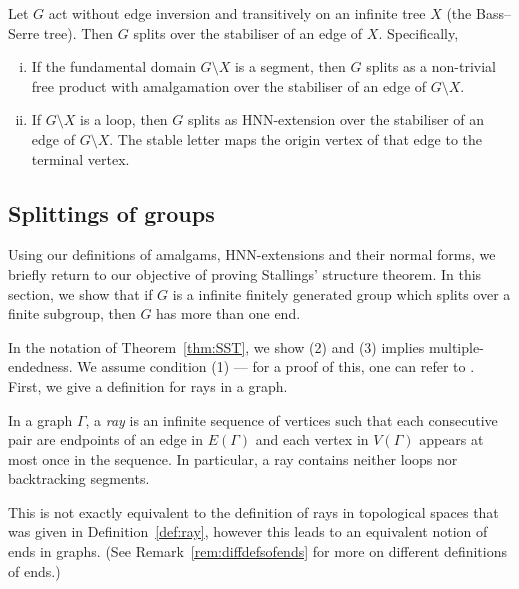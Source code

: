 \begin{theorem}
\label{thm:bassserre}
     Let \(G\) act without edge inversion and transitively on an infinite tree \(X\) (the Bass--Serre tree). Then \(G\) splits over the stabiliser of an edge of \(X\). Specifically,
\begin{enumerate}[(i)]
    \item If the fundamental domain \(G \setminus X\) is a segment, then \(G\) splits as a non-trivial free product with amalgamation over the stabiliser of an edge of \(G \setminus X\). 
    \item If \(G \setminus X\) is a loop, then \(G\) splits as HNN-extension over the stabiliser of an edge of \(G \setminus X\). The stable letter maps the origin vertex of that edge to the terminal vertex.
\end{enumerate}
\end{theorem}

\subsection{Splittings of groups}
  Using our definitions of amalgams, HNN-extensions and their normal forms, we briefly return to our objective of proving Stallings' structure theorem. In this section, we show that if \(G\) is a infinite finitely generated group which splits over a finite subgroup, then \(G\) has more than one end. 
  
  In the notation of Theorem~\ref{thm:SST}, we show (2) and (3) implies multiple-endedness. We assume condition (1) --- for a proof of this, one can refer to \cite[Chapter 11.6, Corollary 11.34]{M08}. First, we give a definition for rays in a graph.

\begin{definition}
    In a graph \(\Gamma\), a \emph{ray} is an infinite sequence of vertices such that each consecutive pair are endpoints of an edge in \(E(\Gamma)\) and each vertex in \(V(\Gamma)\) appears at most once in the sequence. In particular, a ray contains neither loops nor backtracking segments.
\end{definition}

\begin{caveat}
    This is not exactly equivalent to the definition of rays in topological spaces that was given in Definition~\ref{def:ray}, however this leads to an equivalent notion of ends in graphs. (See Remark~\ref{rem:diffdefsofends} for more on different definitions of ends.)
\end{caveat}
  
